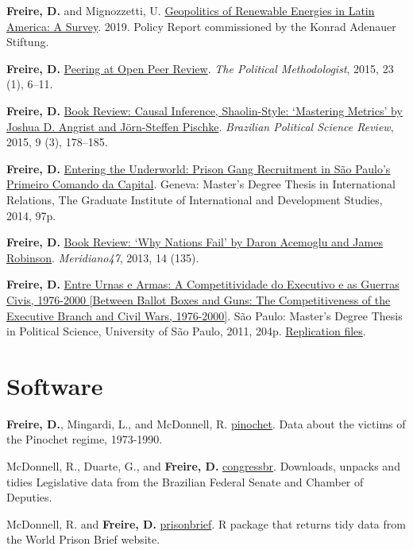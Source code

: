 \documentclass[a4paper]{article}
\renewenvironment{itemize}{
	\begin{list}{}{
			\setlength{\leftmargin}{1.5em}
		}
		}{
	\end{list}
}
\begin{document}
\begin{itemize}
\item \textbf{Freire, D.} and Mignozzetti, U.  \href{https://www.kas.de/documents/273477/273526/Geopolitics+of+Renewable+Energy+in+Latin+America+-+A+Survey.pdf/9fe39ef1-6028-0836-90b0-aada31cb6769?version=1.0&t=1551887777018}{Geopolitics of Renewable Energies in Latin America: A Survey}. 2019. Policy Report commissioned by the Konrad Adenauer Stiftung.
\item \textbf{Freire, D.} \href{https://thepoliticalmethodologist.files.wordpress.com/2016/02/tpm_v23_n1.pdf}{Peering at Open Peer Review}. \textit{The Political Methodologist}, 2015, 23 (1), 6--11.
\item \textbf{Freire, D.} \href{http://www.scielo.br/readcube/epdf.php?doi=10.1590/1981-38212015000300026&pid=S1981-38212015000300178&pdf_path=bpsr/v9n3/1981-3821-bpsr-9-3-0178.pdf&lang=en}{Book Review: Causal Inference, Shaolin-Style: `Mastering Metrics' by Joshua D. Angrist and J\"{o}rn-Steffen Pischke}. \textit{Brazilian Political Science Review}, 2015, 9 (3), 178--185.
\item \textbf{Freire, D.} \href{http://dx.doi.org/10.6084/m9.figshare.1209203}{Entering the Underworld: Prison Gang Recruitment in S\~{a}o Paulo's Primeiro Comando da Capital}. Geneva: Master's Degree Thesis in International Relations, The Graduate Institute of International and Development Studies, 2014, 97p.
\item \textbf{Freire, D.} \href{http://seer.bce.unb.br/index.php/MED/article/view/7505/6497}{Book Review: `Why Nations Fail' by Daron Acemoglu and James Robinson}. \textit{Meridiano47}, 2013, 14 (135).
\item \textbf{Freire, D.} \href{http://dx.doi.org/10.6084/m9.figshare.963082}{Entre Urnas e Armas: A Competitividade do Executivo e as Guerras Civis, 1976-2000 {[}Between Ballot Boxes and Guns: The Competitiveness of the Executive Branch and Civil Wars, 1976-2000{]}}. S\~{a}o Paulo: Master's Degree Thesis in Political Science, University of S\~{a}o Paulo, 2011, 204p. \href{http://dx.doi.org/10.6084/m9.figshare.963183}{Replication files}.
\end{itemize}

\section*{Software}

\begin{itemize}
\item \textbf{Freire, D.}, Mingardi, L., and McDonnell, R. \href{http://danilofreire.github.io/pinochet}{pinochet}. Data about the victims of the Pinochet regime, 1973-1990.
\item McDonnell, R., Duarte, G., and \textbf{Freire, D.} \href{https://github.com/RobertMyles/congressbr}{congressbr}. Downloads, unpacks and tidies Legislative data from the Brazilian Federal Senate and Chamber of Deputies.
\item McDonnell, R. and \textbf{Freire, D.} \href{http://danilofreire.github.io/prisonbrief}{prisonbrief}. R package that returns tidy data from the World Prison Brief website.
\end{itemize}
\end{document}
